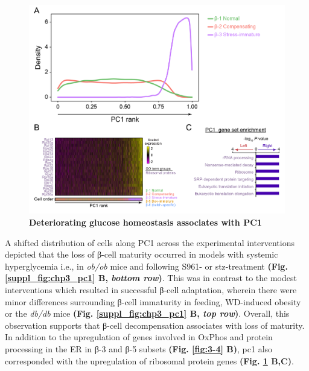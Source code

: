 \begin{figure}[H]
\centering
\includegraphics[width=\linewidth]{Chapter5/Fig/F3-6-02}
\caption[Deteriorating glucose homeostasis associates with PC1]{\textbf{Deteriorating glucose homeostasis associates with PC1}\\}
\label{fig:3-6}
\end{figure}


A shifted distribution of cells along PC1 across the experimental interventions depicted that the loss of β-cell maturity occurred in models with systemic hyperglycemia i.e., in \textit{ob/ob} mice and following S961- or \gls{stz}-treatment \textbf{(Fig. \ref{suppl_fig:chp3_pc1} B, \textit{bottom row})}. This was in contrast to the modest interventions which resulted in successful β-cell adaptation, wherein there were minor differences surrounding β-cell immaturity in feeding, WD-induced obesity or the \textit{db/db} mice \textbf{(Fig. \ref{suppl_fig:chp3_pc1} B, \textit{top row})}. Overall, this observation supports that β-cell decompensation associates with loss of maturity. In addition to the upregulation of genes involved in OxPhos and protein processing in the ER in β-3 and β-5 subsets \textbf{(Fig. \ref{fig:3-4} B)}, \gls{pc}1 also corresponded with the upregulation of ribosomal protein genes \textbf{(Fig. \ref{fig:3-6} B,C)}.\\ %


